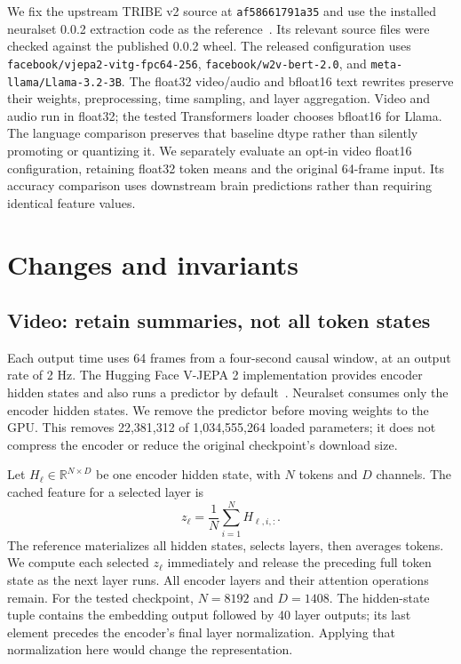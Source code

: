 \documentclass[10pt]{article}
\begin{document}
We fix the upstream TRIBE v2 source at
\texttt{af58661791a35} and use the installed neuralset
0.0.2 extraction code as the reference~\cite{tribe,neuralset}. Its relevant source files were checked
against the published 0.0.2 wheel. The released configuration uses
\texttt{facebook/vjepa2-vitg-fpc64-256}, \texttt{facebook/w2v-bert-2.0}, and
\texttt{meta-llama/Llama-3.2-3B}. The float32 video/audio and bfloat16 text
rewrites preserve their weights, preprocessing, time
sampling, and layer aggregation. Video and audio run in float32; the tested
Transformers loader chooses bfloat16 for Llama. The language comparison preserves
that baseline dtype rather than silently promoting or quantizing it.
We separately evaluate an opt-in video float16 configuration, retaining float32
token means and the original 64-frame input. Its accuracy comparison uses
downstream brain predictions rather than requiring identical feature values.

\section{Changes and invariants}
\subsection{Video: retain summaries, not all token states}
Each output time uses 64 frames from a four-second causal window, at an output
rate of 2 Hz. The Hugging Face V-JEPA 2 implementation provides encoder hidden
states and also runs a predictor by default~\cite{vjepa,hfvideo}. Neuralset consumes only the encoder
hidden states. We remove the predictor before moving weights to the GPU.
This removes 22,381,312 of 1,034,555,264 loaded parameters; it does not compress
the encoder or reduce the original checkpoint's download size.

Let $H_\ell\in\mathbb{R}^{N\times D}$ be one encoder hidden state, with $N$ tokens
and $D$ channels. The cached feature for a selected layer is
\begin{equation}
z_\ell=\frac{1}{N}\sum_{i=1}^{N}H_{\ell,i,:}.
\end{equation}
The reference materializes all hidden states, selects layers, then averages
tokens. We compute each selected $z_\ell$ immediately and release the preceding
full token state as the next layer runs. All encoder layers and their attention
operations remain. For the tested checkpoint, $N=8192$ and $D=1408$.
The hidden-state tuple contains the embedding output followed by 40 layer
outputs; its last element precedes the encoder's final layer normalization.
Applying that normalization here would change the representation.
\end{document}
